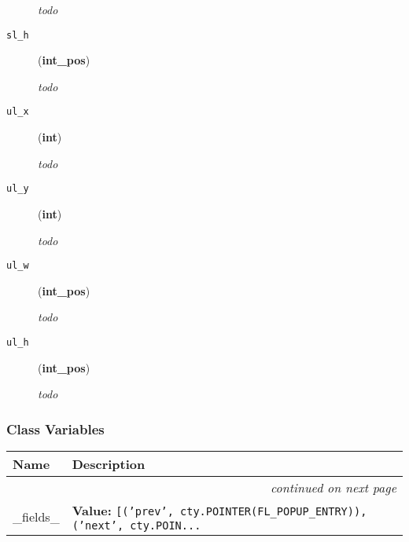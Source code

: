 \begin{description}
\emph{todo}

\item[{\texttt{sl\_h}}] \leavevmode (\textbf{int\_pos})

\emph{todo}

\item[{\texttt{ul\_x}}] \leavevmode (\textbf{int})

\emph{todo}

\item[{\texttt{ul\_y}}] \leavevmode (\textbf{int})

\emph{todo}

\item[{\texttt{ul\_w}}] \leavevmode (\textbf{int\_pos})

\emph{todo}

\item[{\texttt{ul\_h}}] \leavevmode (\textbf{int\_pos})

\emph{todo}

\end{description}




  \subsubsection{Class Variables}

    \vspace{-1cm}
\hspace{\varindent}\begin{longtable}{|p{\varnamewidth}|p{\vardescrwidth}|l}
\cline{1-2}
\cline{1-2} \centering \textbf{Name} & \centering \textbf{Description}& \\
\cline{1-2}
\endhead\cline{1-2}\multicolumn{3}{r}{\small\textit{continued on next page}}\\\endfoot\cline{1-2}
\endlastfoot\raggedright \_\-f\-i\-e\-l\-d\-s\-\_\- & \raggedright \textbf{Value:} 
{\tt [('prev', cty.POINTER(FL\_POPUP\_ENTRY)), ('next', cty.POIN\texttt{...}}&\\
\cline{1-2}
\end{longtable}



